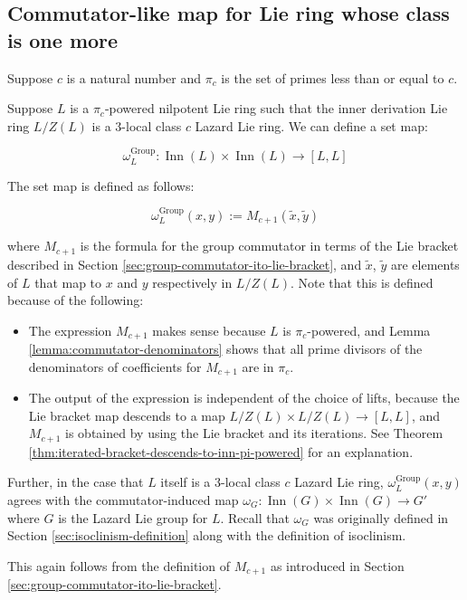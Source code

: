 \subsection{Commutator-like map for Lie ring whose class is one more}\label{sec:commutator-like-map}

Suppose $c$ is a natural number and $\pi_c$ is the set of primes less
than or equal to $c$.

Suppose $L$ is a $\pi_c$-powered nilpotent Lie ring such that the
inner derivation Lie ring $L/Z(L)$ is a $3$-local class $c$ Lazard Lie
ring. We can define a set map:

$$\omega_L^{\text{Group}}: \operatorname{Inn}(L) \times \operatorname{Inn}(L) \to [L,L]$$

The set map is defined as follows:

$$\omega^{\text{Group}}_L(x,y) := M_{c+1}(\tilde{x},\tilde{y})$$

where $M_{c+1}$ is the formula for the group commutator in terms of
the Lie bracket described in Section
\ref{sec:group-commutator-ito-lie-bracket}, and $\tilde{x}$,
$\tilde{y}$ are elements of $L$ that map to $x$ and $y$ respectively
in $L/Z(L)$. Note that
this is defined because of the following:

\begin{itemize}
\item The expression $M_{c+1}$ makes sense because $L$ is $\pi_c$-powered,
  and Lemma \ref{lemma:commutator-denominators} shows that all prime
  divisors of the denominators of coefficients for $M_{c+1}$ are in $\pi_c$.
\item The output of the expression is independent of the choice of
  lifts, because the Lie bracket map descends to a map $L/Z(L) \times
  L/Z(L) \to [L,L]$, and $M_{c+1}$ is obtained by using the Lie
  bracket and its iterations. See Theorem
  \ref{thm:iterated-bracket-descends-to-inn-pi-powered} for an explanation.
\end{itemize}

Further, in the case that $L$ itself is a $3$-local class $c$ Lazard
Lie ring, $\omega_L^{\text{Group}}(x,y)$ agrees with the
commutator-induced map $\omega_G: \operatorname{Inn}(G) \times
\operatorname{Inn}(G) \to G'$ where $G$ is the Lazard Lie group for
$L$. Recall that $\omega_G$ was originally defined in Section
\ref{sec:isoclinism-definition} along with the definition of
isoclinism.

This again follows from the definition of $M_{c+1}$ as introduced in
Section \ref{sec:group-commutator-ito-lie-bracket}.

